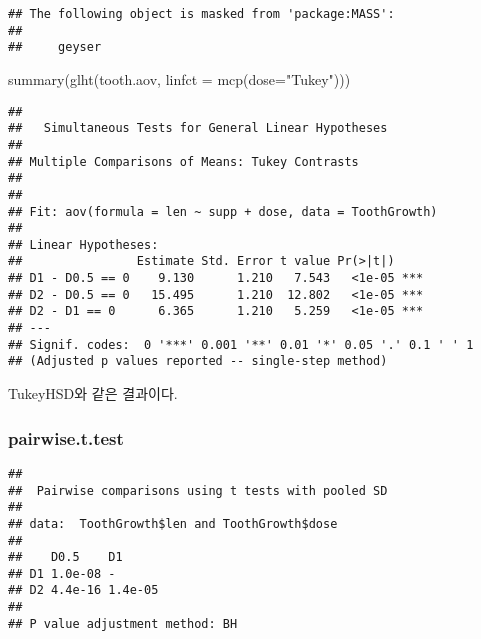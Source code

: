 \documentclass[
]{article}
\newenvironment{Shaded}{\begin{snugshade}}{\end{snugshade}}
\newcommand{\AttributeTok}[1]{\textcolor[rgb]{0.77,0.63,0.00}{#1}}
\newcommand{\FunctionTok}[1]{\textcolor[rgb]{0.00,0.00,0.00}{#1}}
\newcommand{\NormalTok}[1]{#1}
\newcommand{\SpecialCharTok}[1]{\textcolor[rgb]{0.00,0.00,0.00}{#1}}
\newcommand{\StringTok}[1]{\textcolor[rgb]{0.31,0.60,0.02}{#1}}
\begin{document}
\begin{verbatim}
## The following object is masked from 'package:MASS':
## 
##     geyser
\end{verbatim}

\begin{Shaded}
\begin{Highlighting}[]
\FunctionTok{summary}\NormalTok{(}\FunctionTok{glht}\NormalTok{(tooth.aov, }\AttributeTok{linfct =} \FunctionTok{mcp}\NormalTok{(}\AttributeTok{dose=}\StringTok{"Tukey"}\NormalTok{)))}
\end{Highlighting}
\end{Shaded}

\begin{verbatim}
## 
##   Simultaneous Tests for General Linear Hypotheses
## 
## Multiple Comparisons of Means: Tukey Contrasts
## 
## 
## Fit: aov(formula = len ~ supp + dose, data = ToothGrowth)
## 
## Linear Hypotheses:
##                Estimate Std. Error t value Pr(>|t|)    
## D1 - D0.5 == 0    9.130      1.210   7.543   <1e-05 ***
## D2 - D0.5 == 0   15.495      1.210  12.802   <1e-05 ***
## D2 - D1 == 0      6.365      1.210   5.259   <1e-05 ***
## ---
## Signif. codes:  0 '***' 0.001 '**' 0.01 '*' 0.05 '.' 0.1 ' ' 1
## (Adjusted p values reported -- single-step method)
\end{verbatim}

TukeyHSD와 같은 결과이다.

\hypertarget{pairwise.t.test}{%
\subsubsection{pairwise.t.test}\label{pairwise.t.test}}

\begin{Shaded}
\end{Shaded}

\begin{verbatim}
## 
##  Pairwise comparisons using t tests with pooled SD 
## 
## data:  ToothGrowth$len and ToothGrowth$dose 
## 
##    D0.5    D1     
## D1 1.0e-08 -      
## D2 4.4e-16 1.4e-05
## 
## P value adjustment method: BH
\end{verbatim}
\end{document}
